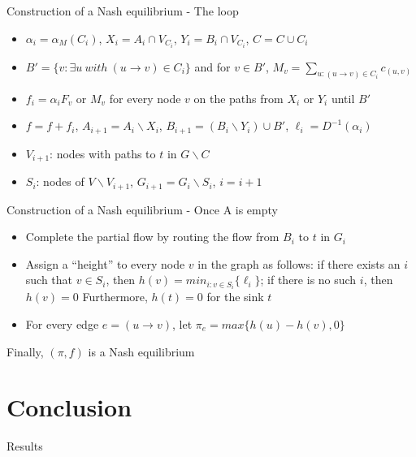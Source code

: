 \documentclass{beamer}
\begin{document}
\begin{frame}{Construction of a Nash equilibrium - The loop}

\begin{itemize}

\item $\alpha_i = \alpha_M(C_i)$, $X_i = A_i \cap V_{C_i}$, $Y_i = B_i \cap V_{C_i}$, $C = C \cup C_i$
\item $B' = \{ v : \exists u\ with\ (u \to v) \in C_i\}$ and for $v \in B'$, $M_v = \sum_{u :(u \to v) \in C_i}c_{(u,v)}$
\item $f_i = \alpha_i F_v$ or $M_v$ for every node $v$ on the paths from $X_i$ or $Y_i$ until $B'$
\item $f = f+f_i$, $A_{i+1} = A_i \backslash X_i$, $B_{i+1} = (B_i \backslash Y_i) \cup B'$, $\ell_i = D^{-1}(\alpha_i)$
\item $V_{i+1}$: nodes with paths to $t$ in $G \backslash C$
\item $S_i$: nodes of $V \backslash V_{i+1}$, $G_{i+1} = G_i \backslash S_i$, $i=i+1$

\end{itemize}

\end{frame}

\begin{frame}{Construction of a Nash equilibrium - Once A is empty}

\begin{itemize}

\item Complete the partial flow by routing the flow from $B_i$ to $t$ in $G_i$
\item Assign a “height” to every node $v$ in the graph as follows: if there exists an $i$ such 
that $v \in S_i$, then $h(v) = min_{i:v\in S_i}\{\ell_i\}$; if there is no such $i$,
 then $h(v) = 0$ Furthermore, $h(t)= 0$ for the sink $t$
\item For every edge $e = (u \to v)$, let $\pi_e = max\{h(u) - h(v), 0\}$

\end{itemize}

Finally, $(\pi, f)$ is a Nash equilibrium 

\end{frame}

\section{Conclusion}

\begin{frame}{Results}
\end{frame}
\end{document}
